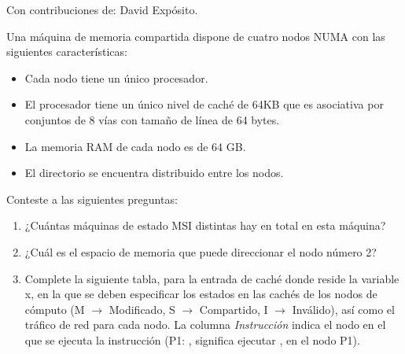 \begin{acexercise}
Con contribuciones de: David Expósito.
\end{acexercise}

Una máquina de memoria compartida dispone de cuatro nodos NUMA con las siguientes características:

\begin{itemize}
  \item Cada nodo tiene un único procesador.
  \item El procesador tiene un único nivel de caché de 64KB que es asociativa por conjuntos de 8 vías con tamaño de
línea de 64 bytes.
  \item La memoria RAM de cada nodo es de 64 GB.
  \item El directorio se encuentra distribuido entre los nodos.
\end{itemize}

Conteste a las siguientes preguntas:

\begin{enumerate}

  \item ¿Cuántas máquinas de estado MSI distintas hay en total en esta máquina?

  \item ¿Cuál es el espacio de memoria que puede direccionar el nodo número 2?

  \item Complete la siguiente tabla, para la entrada de caché donde reside la variable x, en la que se deben
        especificar los estados en las cachés de los nodos de cómputo 
        (M $\rightarrow$ Modificado, S $\rightarrow$ Compartido, I $\rightarrow$ Inválido), 
        así como el tráfico de red para cada nodo. 
        La columna \emph{Instrucción} indica el nodo en el que se ejecuta la instrucción
        (P1: , significa ejecutar 
        , en el nodo P1).

\end{enumerate}

